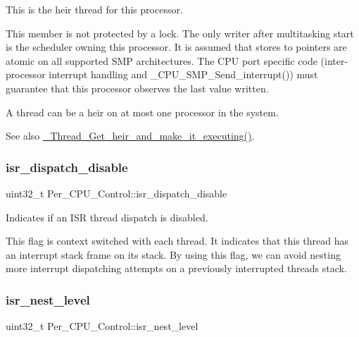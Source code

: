 This is the heir thread for this processor. 

This member is not protected by a lock. The only writer after multitasking start is the scheduler owning this processor. It is assumed that stores to pointers are atomic on all supported S\+MP architectures. The C\+PU port specific code (inter-\/processor interrupt handling and \+\_\+\+C\+P\+U\+\_\+\+S\+M\+P\+\_\+\+Send\+\_\+interrupt()) must guarantee that this processor observes the last value written.

A thread can be a heir on at most one processor in the system.

\begin{DoxySeeAlso}{See also}
\mbox{\hyperlink{group__RTEMSScoreThread_gacd7c2e371fbc36ba623dffe713e6c427}{\+\_\+\+Thread\+\_\+\+Get\+\_\+heir\+\_\+and\+\_\+make\+\_\+it\+\_\+executing()}}. 
\end{DoxySeeAlso}
\mbox{\label{structPer__CPU__Control_a255ba7c5e213a7a2513ab0c5a5a29f64}} 
\subsubsection{\texorpdfstring{isr\_dispatch\_disable}{isr\_dispatch\_disable}}
{\footnotesize\ttfamily uint32\+\_\+t Per\+\_\+\+C\+P\+U\+\_\+\+Control\+::isr\+\_\+dispatch\+\_\+disable}



Indicates if an I\+SR thread dispatch is disabled. 

This flag is context switched with each thread. It indicates that this thread has an interrupt stack frame on its stack. By using this flag, we can avoid nesting more interrupt dispatching attempts on a previously interrupted thread\textquotesingle{}s stack. \mbox{\label{structPer__CPU__Control_aee16a4dbad577bfb87c857042f089c69}} 
\subsubsection{\texorpdfstring{isr\_nest\_level}{isr\_nest\_level}}
{\footnotesize\ttfamily uint32\+\_\+t Per\+\_\+\+C\+P\+U\+\_\+\+Control\+::isr\+\_\+nest\+\_\+level}

